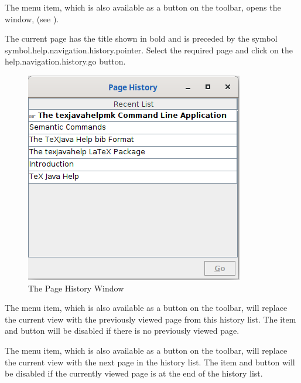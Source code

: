 
The  menu item, which is also
available as a button on the toolbar, opens the
 window,
(see ).

The current page has the title shown in bold and is preceded by
the symbol \gls{symbol.help.navigation.history.pointer}.
Select the required page and click on the
\gls{help.navigation.history.go} button.

\begin{figure}
\centering
\includegraphics{images/historyframe}

\caption{The Page History Window}
\label{fig:historywindow}
\end{figure}


The  menu item, which is
also available as a button on the toolbar, will replace the current
view with the previously viewed page from this history list. The
item and button will be disabled if there is no previously viewed
page. 


The  menu item, which is
also available as a button on the toolbar, will replace the current view with the
next page in the history list. The item and button will be disabled if the
currently viewed page is at the end of the history list. 


